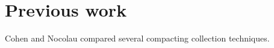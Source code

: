 \section{Previous work}

Cohen and Nocolau \cite{Cohen:1983:CCA:69575.357226} compared several
compacting collection techniques.
